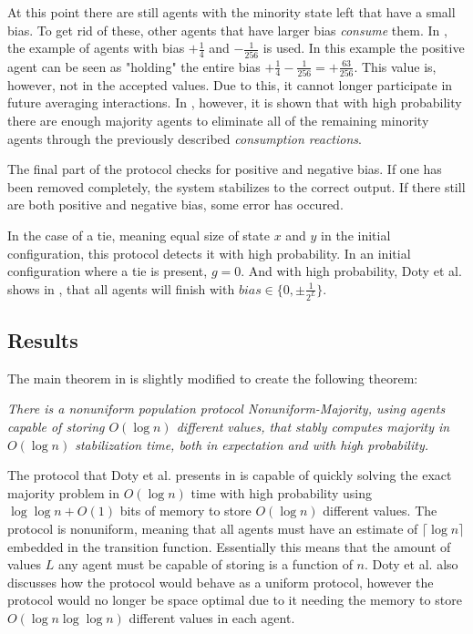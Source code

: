 At this point there are still agents with the minority state left that have a small bias. To get rid of these, other agents that have larger bias \emph{consume} them. In \cite{dotyTimeSpaceOptimal2022}, the example of agents with bias $+ \frac{1}{4}$ and $- \frac{1}{256}$ is used. In this example the positive agent can be seen as "holding" the entire bias $+ \frac{1}{4} - \frac{1}{256} = + \frac{63}{256}$. This value is, however, not in the accepted values. Due to this, it cannot longer participate in future averaging interactions. In \cite{dotyTimeSpaceOptimal2022}, however, it is shown that with high probability there are enough majority agents to eliminate all of the remaining minority agents through the previously described \emph{consumption reactions}.

The final part of the protocol checks for positive and negative bias. If one has been removed completely, the system stabilizes to the correct output. If there still are both positive and negative bias, some error has occured.

In the case of a tie, meaning equal size of state $x$ and $y$ in the initial configuration, this protocol detects it with high probability. In an initial configuration where a tie is present, $g = 0$. And with high probability, Doty et al. shows in \cite{dotyTimeSpaceOptimal2022}, that all agents will finish with $bias \in \{ 0, \pm \frac{1}{2^L} \}$. 


\subsection{Results} \label{Section4Results}

The main theorem in \cite{dotyTimeSpaceOptimal2022} is slightly modified to create the following theorem: 

 \begin{theorem}
    \textit{
        There is a nonuniform population protocol Nonuniform-Majority, using agents capable of storing $O(\log n)$ different values, that stably computes majority in $O(\log n)$ stabilization time, both in expectation and with high probability.
    }
 \end{theorem} 

The protocol that Doty et al. presents in \cite{dotyTimeSpaceOptimal2022} is capable of quickly solving the exact majority problem in $O(\log n)$ time with high probability using $\log \log n + O(1)$ bits of memory to store $O(\log n)$ different values. The protocol is nonuniform, meaning that all agents must have an estimate of $\lceil \log n \rceil$ embedded in the transition function. Essentially this means that the amount of values $L$ any agent must be capable of storing is a function of $n$. Doty et al. also discusses how the protocol would behave as a uniform protocol, however the protocol would no longer be space optimal due to it needing the memory to store $O(\log n \log \log n)$ different values in each agent. 

